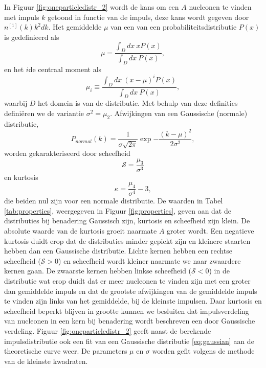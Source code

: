 \documentclass[11pt,twoside]{book}
\begin{document}
In Figuur \ref{fig:oneparticledistr_2} wordt de kans om een $A$ nucleonen te vinden met impuls $k$ getoond in functie van de impuls, deze kans wordt gegeven door $n^{[1]}(k)k^2dk$. 
Het gemiddelde $\mu$ van een van een probabiliteitsdistributie $P(x)$ is gedefinieerd als
\begin{equation}
\mu = \frac{\int_D dx\ xP(x)}{\int_D dx\ P(x)},
\end{equation}
en het $i$de centraal moment als
\begin{equation}
\mu_i \equiv \frac{\int_D dx\ (x-\mu)^i P(x)}{\int_D dx\ P(x)},
\end{equation}
waarbij $D$ het domein is van de distributie. 
Met behulp van deze definities defini\"{e}ren we de variantie $\sigma^2 = \mu_2$. Afwijkingen van een Gaussische (normale) distributie,
\begin{equation} \label{eq:gaussian}
P_{normal}(k)= \frac{1}{\sigma \sqrt{2\pi}} \exp{-\frac{(k-\mu)^2}{2\sigma^2}},
\end{equation}
worden gekarakteriseerd door scheefheid
\begin{equation} \label{eq:skew}
\mathcal{S}  = \frac{\mu_3}{\sigma^3}
\end{equation}
en kurtosis
\begin{equation} \label{eq:kurtosis}
\kappa  = \frac{\mu_4}{\sigma^4} - 3,
\end{equation}
die beiden nul zijn voor een normale distributie. De waarden in Tabel \ref{tab:properties}, weergegeven in Figuur \ref{fig:properties}, geven aan dat de distributies bij benadering Gaussisch zijn, kurtosis en scheefheid zijn klein. De absolute waarde van de kurtosis groeit naarmate $A$ groter wordt. Een negatieve kurtosis duidt erop dat de distributies minder gepiekt zijn en kleinere staarten hebben dan een Gaussische distributie. Lichte kernen hebben een rechtse scheefheid ($\mathcal{S} > 0$) en scheefheid wordt kleiner naarmate we naar zwaardere kernen gaan. De zwaarste kernen hebben linkse scheefheid ($\mathcal{S} < 0$) in de distributie wat erop duidt dat er meer nucleonen te vinden zijn met een groter dan gemiddelde impuls en dat de grootste afwijkingen van de gemiddelde impuls te vinden zijn links van het gemiddelde, bij de kleinste impulsen. Daar kurtosis en scheefheid beperkt blijven in grootte kunnen we besluiten dat impulsverdeling van nucleonen in een kern bij benadering wordt beschreven een door Gaussische verdeling. Figuur \ref{fig:oneparticledistr_2} geeft naast de berekende impulsdistributie ook een fit van een Gaussische distributie \eqref{eq:gaussian} aan de theoretische curve weer. De parameters $\mu$ en $\sigma$ worden gefit volgens de methode van de kleinste kwadraten.
\end{document}
